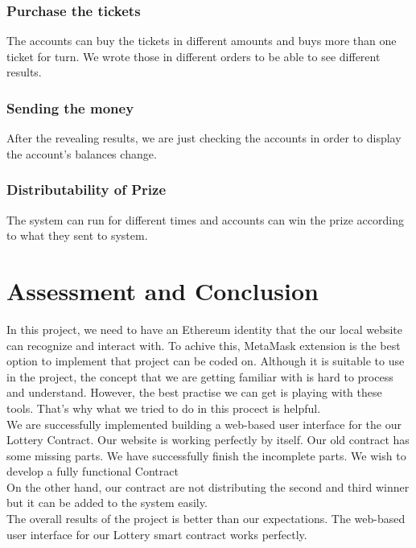 \documentclass[]{scrreprt}
\begin{document}
			\subsection{Purchase the tickets}
			The accounts can buy the tickets in different amounts and buys more than one ticket for turn. We wrote  those in different orders to be able to see different results. 
			\subsection{Sending the money}
			After the revealing results, we are just checking the accounts in order to display the account's balances change. 
			\subsection{Distributability of Prize}
			The system can run for different times and accounts can win the prize according to what they sent to system.
			
\chapter{Assessment and Conclusion}
In this project, we need to have an Ethereum identity that the our local website can recognize and interact with. To achive this,  MetaMask extension is the best option to implement that project can be coded on. Although it is suitable to use in the project, the concept that we are getting familiar with is hard to process and understand. However, the best practise we can get is playing with these tools. That's why what we tried to do in this procect is helpful.\\
We are successfully implemented building a web-based user interface for the our Lottery Contract. Our website is working perfectly by itself. Our old contract has some missing parts. We have successfully finish the incomplete parts. We wish to develop a fully functional Contract \\
On the other hand, our contract are not distributing the second and third winner but it can be added to the system easily.\\
The overall results of the project is better than our expectations. The web-based user interface for our Lottery smart contract works perfectly.


\begin{appendices}


\end{appendices}
\end{document}
